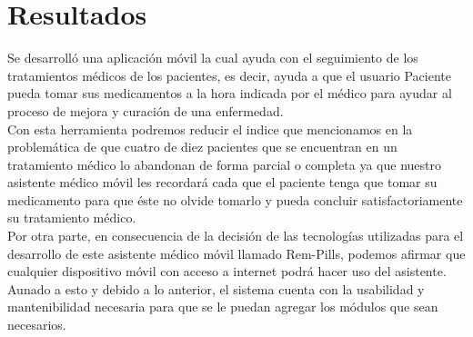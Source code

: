 \newpage
\section{Resultados}

Se desarrolló una aplicación móvil la cual ayuda con el seguimiento de los tratamientos médicos de los pacientes, es decir, ayuda a que el usuario Paciente pueda tomar sus medicamentos a la hora indicada por el médico para ayudar al proceso de mejora y curación de una enfermedad.\\

Con esta herramienta podremos reducir el indice que mencionamos en la problemática de que cuatro de diez pacientes que se encuentran en un tratamiento médico lo abandonan de forma parcial o completa ya que nuestro asistente médico móvil les recordará cada que el paciente tenga que tomar su medicamento para que éste no olvide tomarlo y pueda concluir satisfactoriamente su tratamiento médico.\\

Por otra parte, en consecuencia de la decisión de las tecnologías utilizadas para el desarrollo de este asistente médico móvil llamado Rem-Pills, podemos afirmar que cualquier dispositivo móvil con acceso a internet podrá hacer uso del asistente. Aunado a esto y debido a lo anterior, el sistema cuenta con la usabilidad y mantenibilidad necesaria para que se le puedan agregar los módulos que sean necesarios.

